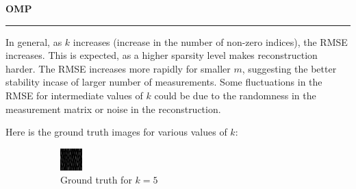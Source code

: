 \documentclass[a4paper,12pt]{article}
\newenvironment{solution}[2][]{%
    \begin{mdframed}[linecolor=blue!70!black, linewidth=2pt, roundcorner=10pt, backgroundcolor=yellow!10!white, skipabove=12pt, skipbelow=12pt]%
        \textbf{\large #2}
        \par\noindent\rule{\textwidth}{0.4pt}
}{
    \end{mdframed}
}
\begin{document}
\begin{solution}{OMP}
In general, as $k$ increases (increase in the number of non-zero indices), the RMSE increases. This is expected, as a higher sparsity level makes reconstruction harder. The RMSE increases more rapidly for smaller $m$, suggesting the better stability incase of larger number of measurements. Some fluctuations in the RMSE for intermediate values of $k$ could be due to the randomness in the measurement matrix or noise in the reconstruction.

Here is the ground truth images for various values of $k$:

\begin{figure}[H]
  \centering
  \begin{subfigure}[t]{0.32\textwidth}
      \centering
      \includegraphics[width=\textwidth]{../images/omp/Ground_Truth_k_5.png}
      \caption{Ground truth for $k = 5$}
  \end{subfigure}
  \begin{subfigure}[t]{0.32\textwidth}
      \centering

\end{subfigure}
\end{figure}
\end{solution}
\end{document}
